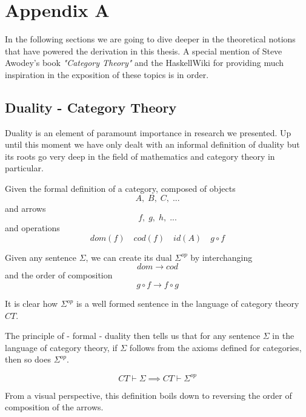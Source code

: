 \chapter{Appendix A}
\label{app:a}

In the following sections we are going to dive deeper in the theoretical notions that have powered the derivation in this thesis. A special mention of Steve Awodey's book \textit{"Category Theory"}\cite{awodey2010category} and the HaskellWiki\cite{haskellwiki} for providing much inspiration in the exposition of these topics is in order.

\section{Duality - Category Theory}

Duality is an element of paramount importance in research we presented. Up until this moment we have only dealt with an informal definition of duality but its roots go very deep in the field of mathematics and category theory in particular.

Given the formal definition of a category, composed of objects $$A,\; B,\; C,\; ...$$ and arrows $$f,\; g,\; h,\; ... $$ and operations $$ dom(f) \quad cod(f) \quad id(A) \quad g \circ f $$ 

Given any sentence $ \Sigma $, we can create its dual $ \Sigma^{op} $ by interchanging $$dom \to cod$$ and the order of composition $$ g \circ f \to f \circ g $$ 

It is clear how $ \Sigma^{op} $ is a well formed sentence in the language of category theory $ CT $.

The principle of - formal - duality then tells us that for any sentence $ \Sigma $ in the language of category theory, if $ \Sigma $ follows from the axioms defined for categories, then so does $ \Sigma^{op}$. 

$$ CT \vdash \Sigma \implies CT \vdash \Sigma^{op} $$

From a visual perspective, this definition boils down to reversing the order of composition of the arrows. 

